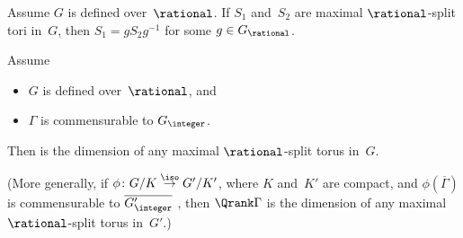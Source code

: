 \begin{thm}
Assume $G$ is defined over~$\rational$.
If $S_1$ and~$S_2$ are maximal\/ $\rational$-split tori in~$G$, then $S_1 = g S_2 g^{-1}$ for some $g \in G_\rational$.
\end{thm}

\begin{defn} \label{Qrank-arithmetic}
 Assume
 \noprelistbreak
 	\begin{itemize}
	\item $G$ is defined over~$\rational$, 
	and 
	\item $\Gamma$ is commensurable to $G_{\integer}$. 
	\end{itemize}
Then %
 is the dimension of any maximal $\rational$-split torus in~$G$. 

(More generally, if $\phi \colon G/K \stackrel{\iso}{\to} G'/K'$, where $K$
and~$K'$ are compact, and $\phi(\overline{\Gamma})$ is
commensurable to $\overline{G'_{\integer}}$
, then $\Qrank \Gamma$ is the
dimension of any maximal $\rational$-split torus in~$G'$.)
 \end{defn}
 
